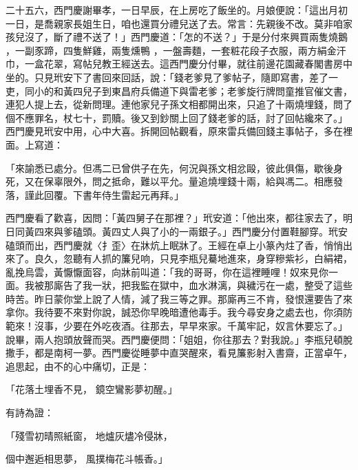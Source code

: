 二十五六，西門慶謝畢孝，一日早辰，在上房吃了飯坐的。月娘便說：「這出月初一日，是喬親家長姐生日，咱也還買分禮兒送了去。常言：先親後不改。莫非咱家孩兒沒了，斷了禮不送了！」西門慶道：「怎的不送？」于是分付來興買兩隻燒鵝 ，一副豕蹄，四隻鮮雞，兩隻燻鴨 ，一盤壽麵，一套粧花段子衣服，兩方絹金汗巾，一盒花翠，寫帖兒教王經送去。這西門慶分付畢，就往前邊花園藏春閣書房中坐的。只見玳安下了書回來回話，說：「錢老爹見了爹帖子，隨即寫書，差了一吏，同小的和黃四兒子到東昌府兵備道下與雷老爹；老爹旋行牌問童推官催文書，連犯人提上去，從新問理。連他家兒子孫文相都開出來，只追了十兩燒埋錢，問了個不應罪名，杖七十，罰贖。後又到鈔關上回了錢老爹的話，討了回帖纔來了。」西門慶見玳安中用，心中大喜。拆開回帖觀看，原來雷兵備回錢主事帖子，多在裡面。上寫道：

「來諭悉已處分。但馮二已曾供子在先，何況與孫文相忿毆，彼此俱傷，歇後身死，又在保辜限外，問之抵命，難以平允。量追燒埋錢十兩，給與馮二。相應發落，謹此回覆。下書年侍生雷起元再拜。」

西門慶看了歡喜，因問：「黃四舅子在那裡？」玳安道：「他出來，都往家去了，明日同黃四來與爹磕頭。黃四丈人與了小的一兩銀子。」西門慶分付置鞋腳穿。玳安磕頭而出，西門慶就〈扌歪〉在牀炕上眠牀了。王經在卓上小篆內炷了香，悄悄出來了。良久，忽聽有人抓的簾兒响，只見李瓶兒驀地進來，身穿糝紫衫，白絹裙，亂挽烏雲，黃懨懨面容，向牀前叫道：「我的哥哥，你在這裡睡哩！奴來見你一面。我被那廝告了我一狀，把我監在獄中，血水淋漓，與穢污在一處，整受了這些時苦。昨日蒙你堂上說了人情，減了我三等之罪。那廝再三不肯，發恨還要告了來拿你。我待要不來對你說，誠恐你早晚暗遭他毒手。我今尋安身之處去也，你須防範來！沒事，少要在外吃夜酒。往那去，早早來家。千萬牢記，奴言休要忘了。」說畢，兩人抱頭放聲而哭。西門慶便問：「姐姐，你往那去？對我說。」李瓶兒頓脫撒手，都是南柯一夢。西門慶從睡夢中直哭醒來，看見簾影射入書齋，正當卓午，追思起，由不的心中痛切，正是：

「花落土埋香不見，  鏡空鸞影夢初醒。」

有詩為證：

「殘雪初晴照紙窗，  地爐灰燼冷侵牀，

個中邂逅相思夢，  風撲梅花斗帳香。」

